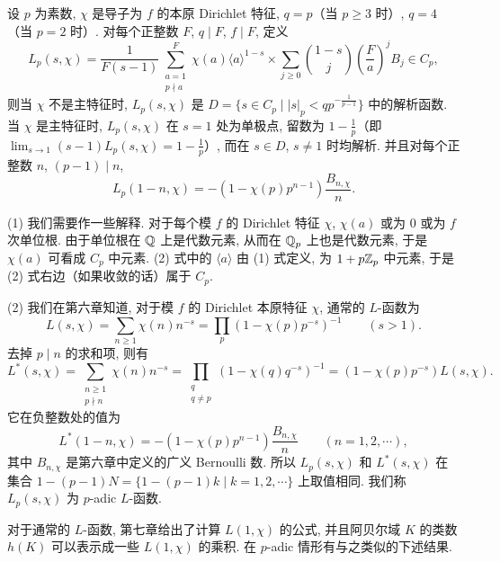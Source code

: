 \begin{theorem}\label{thm:9.17}
设 $p$ 为素数, $\chi$ 是导子为 $f$ 的本原 Dirichlet 特征, $q=p$（当 $p\geqslant 3$ 时）, $q=4$（当 $p=2$ 时）. 对每个正整数 $F$, $q\mid F$, $f\mid F$, 定义
\begin{equation}\tag{2}
  L_p(s,\chi)=\frac{1}{F(s-1)}\sum_{\substack{a=1\\ p\nmid a}}^{F}\chi(a)\langle a\rangle^{1-s}
  \times\sum_{j\geqslant 0}\binom{1-s}{j}\left(\frac{F}{a}\right)^jB_j\in C_p,
\end{equation}
则当 $\chi$ 不是主特征时, $L_p(s,\chi)$ 是 $D=\{s\in C_p\mid|s|_p<qp^{-\frac{1}{p-1}}\}$ 中的解析函数. 当 $\chi$ 是主特征时, $L_p(s,\chi)$ 在 $s=1$ 处为单极点, 留数为 $1-\frac{1}{p}$（即 $\lim_{s\to1}(s-1)L_p(s,\chi)=1-\frac{1}{p}$）, 而在 $s\in D$, $s\neq 1$ 时均解析. 并且对每个正整数 $n$, $(p-1)\mid n$,
\begin{equation}\tag{3}
  L_p(1-n,\chi)=-(1-\chi(p)p^{n-1})\frac{B_{n,\chi}}{n}.
\end{equation}
\end{theorem}

\begin{remark}
(1) 我们需要作一些解释. 对于每个模 $f$ 的 Dirichlet 特征 $\chi$, $\chi(a)$ 或为 $0$ 或为 $f$ 次单位根. 由于单位根在 $\mathbb{Q}$ 上是代数元素, 从而在 $\mathbb{Q}_p$ 上也是代数元素, 于是 $\chi(a)$ 可看成 $C_p$ 中元素. (2) 式中的 $\langle a\rangle$ 由 (1) 式定义, 为 $1+p\mathbb{Z}_p$ 中元素, 于是 (2) 式右边（如果收敛的话）属于 $C_p$.

(2) 我们在第六章知道, 对于模 $f$ 的 Dirichlet 本原特征 $\chi$, 通常的 $L$-函数为
\[
  L(s,\chi)=\sum_{n\geqslant 1}\chi(n)n^{-s}
  =\prod_p(1-\chi(p)p^{-s})^{-1}\qquad(s>1).
\]
去掉 $p\mid n$ 的求和项, 则有
\[
  L^*(s,\chi)=\sum_{\substack{n\geqslant 1\\ p\nmid n}}\chi(n)n^{-s}
  =\prod_{\substack{q\\ q\neq p}}(1-\chi(q)q^{-s})^{-1}
  =(1-\chi(p)p^{-s})L(s,\chi).
\]
它在负整数处的值为
\[
  L^*(1-n,\chi)=-(1-\chi(p)p^{n-1})\frac{B_{n,\chi}}{n}\qquad(n=1,2,\cdots),
\]
其中 $B_{n,\chi}$ 是第六章中定义的广义 Bernoulli 数. 所以 $L_p(s,\chi)$ 和 $L^*(s,\chi)$ 在集合 $1-(p-1)N=\{1-(p-1)k\mid k=1,2,\cdots\}$ 上取值相同. 我们称 $L_p(s,\chi)$ 为 $p$-adic $L$-函数.
\end{remark}

对于通常的 $L$-函数, 第七章给出了计算 $L(1,\chi)$ 的公式, 并且阿贝尔域 $K$ 的类数 $h(K)$ 可以表示成一些 $L(1,\chi)$ 的乘积. 在 $p$-adic 情形有与之类似的下述结果.

